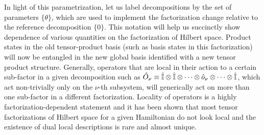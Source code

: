\documentclass[aps,pra,onecolumn,nofootinbib,11pt,tightenlines]{revtex4-1}
\begin{document}
In light of this parametrization, let us label decompositions by the set of parameters $\{\theta \}$, which are used to implement the factorization change relative to the reference decomposition $\{0\}$. This notation will help us succinctly show dependence of various quantities on the factorization of Hilbert space. Product states in the old tensor-product basis (such as basis states in this factorization) will now be entangled in the new global basis identified with a new tensor product structure. Generally, operators that are local in their action to a certain sub-factor in a given decomposition such as $\hat{O}_{\nu} \equiv \hat{\mathbb{I}} \otimes \hat{\mathbb{I}} \otimes \cdots \otimes \hat{o}_{\nu} \otimes \cdots  \otimes \hat{\mathbb{I}}$, which act non-trivially only on the $\nu$-th subsystem, will generically act on more than one sub-factor in a different factorization. Locality of operators is a highly factorization-dependent statement and it has been shown \cite{cotler2019locality} that most tensor factorizations of Hilbert space for a given Hamiltonian do not look local and the existence of dual local descriptions is rare and almost unique.
\end{document}
